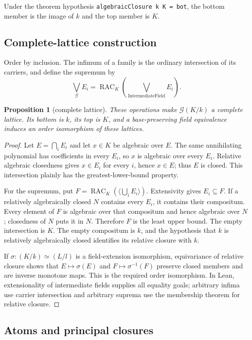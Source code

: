 \documentclass[11pt,oneside]{article}
\newtheorem{proposition}[theorem]{Proposition}
\theoremstyle{definition}
\theoremstyle{remark}
\newcommand{\RAC}{\operatorname{RAC}}
\newcommand{\G}{\mathcal{G}}
\newcommand{\lean}[1]{\nolinkurl{#1}}
\begin{document}
Under the theorem hypothesis \lean{algebraicClosure k K = bot}, the bottom member is
the image of $k$ and the top member is $K$.

\subsection{Complete-lattice construction}

Order by inclusion.  The infimum of a family is the ordinary intersection of its
carriers, and define the supremum by
\[
  \bigvee_{\G} E_i=\RAC_K\!\left(\bigvee_{\operatorname{IntermediateField}}E_i\right).
\]

\begin{proposition}[complete lattice]\label{prop:closed-complete-lattice}
These operations make $\G(K/k)$ a complete lattice.  Its bottom is $k$, its top is $K$,
and a base-preserving field equivalence induces an order isomorphism of these lattices.
\end{proposition}
\begin{proof}
Let $E=\bigcap_iE_i$ and let $x\in K$ be algebraic over $E$.  The same annihilating
polynomial has coefficients in every $E_i$, so $x$ is algebraic over every $E_i$.
Relative algebraic closedness gives $x\in E_i$ for every $i$, hence $x\in E$; thus $E$
is closed.  This intersection plainly has the greatest-lower-bound property.

For the supremum, put $F=\RAC_K(\langle\bigcup_iE_i\rangle)$.  Extensivity gives
$E_i\subseteq F$.  If a relatively algebraically closed $N$ contains every $E_i$, it
contains their compositum.  Every element of $F$ is algebraic over that compositum and
hence algebraic over $N$; closedness of $N$ puts it in $N$.  Therefore $F$ is the least
upper bound.  The empty intersection is $K$.  The empty compositum is $k$, and the
hypothesis that $k$ is relatively algebraically closed identifies its relative closure
with $k$.

If $\sigma:(K/k)\simeq(L/l)$ is a field-extension isomorphism, equivariance of relative
closure shows that $E\mapsto\sigma(E)$ and $F\mapsto\sigma^{-1}(F)$ preserve closed
members and are inverse monotone maps.  This is the required order isomorphism.  In Lean,
extensionality of intermediate fields supplies all equality goals; arbitrary infima use
carrier intersection and arbitrary suprema use the membership theorem for relative
closure.
\end{proof}

\subsection{Atoms and principal closures}
\end{document}
